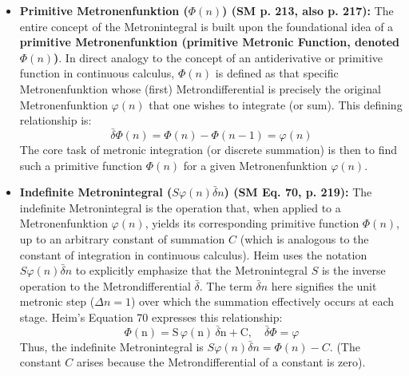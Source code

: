 \documentclass[12pt]{article}
\newcommand{\metronintegral}{S}
\newcommand{\metronenziffer}{n}
\begin{document}
\begin{itemize}
    \item \textbf{Primitive Metronenfunktion (\( \Phi(\metronenziffer) \)) (SM p. 213, also p. 217):}
    The entire concept of the Metronintegral is built upon the foundational idea of a \textbf{primitive Metronenfunktion (primitive Metronic Function, denoted \( \Phi(\metronenziffer) \))}. In direct analogy to the concept of an antiderivative or primitive function in continuous calculus, \( \Phi(\metronenziffer) \) is defined as that specific Metronenfunktion whose (first) Metrondifferential is precisely the original Metronenfunktion \( \varphi(\metronenziffer) \) that one wishes to integrate (or sum). This defining relationship is:
    \[ \bar{\delta}\Phi(\metronenziffer) = \Phi(\metronenziffer) - \Phi(\metronenziffer-1) = \varphi(\metronenziffer) \]
    The core task of metronic integration (or discrete summation) is then to find such a primitive function \( \Phi(\metronenziffer) \) for a given Metronenfunktion \( \varphi(\metronenziffer) \).

    \item \textbf{Indefinite Metronintegral (\( \metronintegral\varphi(\metronenziffer)\bar{\delta}\metronenziffer \)) (SM Eq. 70, p. 219):}
    The indefinite Metronintegral is the operation that, when applied to a Metronenfunktion \( \varphi(\metronenziffer) \), yields its corresponding primitive function \( \Phi(\metronenziffer) \), up to an arbitrary constant of summation \( C \) (which is analogous to the constant of integration in continuous calculus). Heim uses the notation \( \metronintegral \varphi(\metronenziffer) \bar{\delta}\metronenziffer \) to explicitly emphasize that the Metronintegral \( \metronintegral \) is the inverse operation to the Metrondifferential \( \bar{\delta} \). The term \( \bar{\delta}\metronenziffer \) here signifies the unit metronic step (\( \Delta \metronenziffer=1 \)) over which the summation effectively occurs at each stage. Heim's Equation 70 expresses this relationship:
    \begin{equation}
    \Phi(\mathrm{n}) = \mathrm{S}\,\varphi(\mathrm{n})\,\bar{\delta}\mathrm{n} + \mathrm{C}, \quad \bar{\delta}\Phi = \varphi \tag{70}
    \label{eq:original_indefinite_metronintegral}
    \end{equation}
    Thus, the indefinite Metronintegral is \( \metronintegral\varphi(\metronenziffer)\bar{\delta}\metronenziffer = \Phi(\metronenziffer) - C \). (The constant \(C\) arises because the Metrondifferential of a constant is zero).


\end{itemize}
\end{document}
